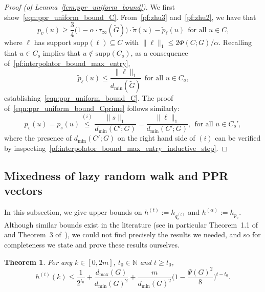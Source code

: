 \documentclass{article}
\newcommand{\1}{\mathbf{1}}
\newcommand{\wt}[1]{\widetilde{#1}}
\newtheorem{theorem}{Theorem}[section]
\theoremstyle{definition}
\theoremstyle{remark}
\begin{document}
\begin{proof}[Proof (of Lemma~\ref{lem:ppr_uniform_bound})]
	We first show~\eqref{eqn:ppr_uniform_bound_C}. From~\eqref{pf:zhu3} and~\eqref{pf:zhu2}, we have that
	\begin{equation*}
	p_v(u) \geq \frac{3}{4}\bigl(1 - \alpha \cdot \tau_{\infty}(\wt{G})\bigr) \cdot \wt{\pi}(u) - \wt{p}_{\ell}(u)~~\textrm{for all $u \in C$,}
	\end{equation*}
	where $\ell$ has support $\mathrm{supp}(\ell) \subseteq C$ with $\|\ell\|_1 \leq 2\Phi(C;G)/\alpha$. Recalling that $u \in C_{o}$ implies that $u \not\in \mathrm{supp}(C_{o})$, as a consequence of~\eqref{pf:interpolator_bound_max_entry}, 
	\begin{equation*}
	\wt{p}_{\ell}(u) \leq \frac{\|\ell\|_1}{d_{\min}(\wt{G})}~~\textrm{for all $u \in C_{o}$,}
	\end{equation*}
	establishing~\eqref{eqn:ppr_uniform_bound_C}. The proof of~\eqref{eqn:ppr_uniform_bound_Cprime} follows similarly:
	\begin{equation*}
	p_v(u) = p_s(u) \overset{(i)}{\leq} \frac{\|s\|_1}{d_{\min}(C';G)} = \frac{\|\ell\|_1}{d_{\min}(C';G)},~~\textrm{for all $u \in C_{o}'$},
	\end{equation*}
	where the presence of $d_{\min}(C';G)$ on the right hand side of $(i)$ can be verified by inspecting~\eqref{pf:interpolator_bound_max_entry_inductive_step}. 	
\end{proof}

\subsection{Mixedness of lazy random walk and PPR vectors}
\label{subsec:lovasz_simonovits_bounds}
In this subsection, we give upper bounds on $h^{(t)} := h_{q_v^{(t)}}$ and $h^{(\alpha)} := h_{p_v}$. Although similar bounds exist in the literature (see in particular Theorem~1.1 of \citep{lovasz1990} and Theorem~3 of~\citep{andersen2006}), we could not find precisely the results we needed, and so for completeness we state and prove these results ourselves. 

\begin{theorem}
	\label{thm:mixing_time_rw}
	For any $k \in [0, 2m]$, $t_0 \in \mathbb{N}$ and $t \geq t_0$,
	\begin{equation}
	\label{eqn:mixing_time_rw_1}
	h^{(t)}(k) \leq \frac{1}{2^{t_0}} + \frac{d_{\max}(G)}{d_{\min}(G)^2} + \frac{m}{d_{\min}(G)^2} \biggl(1 - \frac{\Psi(G)^2}{8}\biggr)^{t - t_0}.
	\end{equation}
\end{theorem}
\end{document}
